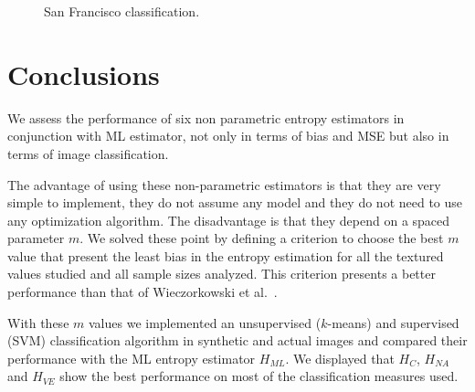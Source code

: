 \documentclass[journal]{IEEEtran}
\begin{document}
\begin{figure}[hbt]
	\caption{San Francisco classification.}
	\label{fig:class_SF}
	\end{figure}    
	
\section{Conclusions}
\label{sec:conclusions}

We assess the performance of six non parametric entropy estimators in conjunction with ML estimator, not only in terms of bias and MSE but also in terms of image classification. 

The advantage of using these non-parametric estimators is that they are very simple to implement, they do not assume any model and they do not need to use any optimization algorithm. The disadvantage is that they depend on a spaced parameter $m$. We solved these point by defining a criterion to choose the best $m$ value that present the least bias in the entropy estimation for all the textured values studied and all sample sizes analyzed. This criterion presents a better performance than that of Wieczorkowski et al.~\cite{Wieczorkowski1999}.

With these $m$ values we implemented an unsupervised ($k$-means) and supervised (SVM) classification  algorithm in synthetic and actual images and compared their performance with the ML entropy estimator $H_{ML}$. We displayed that $H_{C}$, $H_{NA}$ and $H_{VE}$ show the best performance on most of the classification measures used. 
\end{document}
